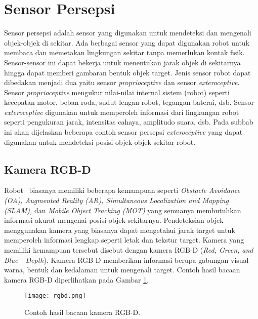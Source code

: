 \section{Sensor Persepsi}
\label{sec:sensor}  
    Sensor persepsi adalah sensor yang digunakan untuk mendeteksi dan mengenali objek-objek di sekitar.
    Ada berbagai sensor yang dapat digunakan robot untuk membaca dan memetakan lingkungan sekitar tanpa memerlukan kontak fisik. Sensor-sensor ini dapat bekerja untuk menentukan jarak objek di sekitarnya hingga dapat memberi gambaran bentuk objek target. Jenis sensor robot dapat dibedakan menjadi dua yaitu sensor \textit{proprioceptive} dan sensor \textit{exteroceptive}\cite{b5}. Sensor \textit{proprioceptive} mengukur nilai-nilai internal sistem (robot) seperti kecepatan motor, beban roda, sudut lengan robot, tegangan baterai, dsb. Sensor \textit{exteroceptive} digunakan untuk memperoleh informasi dari lingkungan robot seperti pengukuran jarak, intensitas cahaya, amplitudo suara, dsb. Pada subbab ini akan dijelaskan beberapa contoh sensor persepsi \textit{exteroceptive} yang dapat digunakan untuk mendeteksi posisi objek-objek sekitar robot.
   
   \subsection{Kamera RGB-D}
    \label{subsec:Sub-Metode_Kamera}
    
    Robot \auto\ biasanya memiliki beberapa kemampuan seperti \textit{Obstacle Avoidance (OA), Augmented Reality (AR), Simultaneous Localization and Mapping (SLAM),} dan \textit{Mobile Object Tracking (MOT)} yang semuanya membutuhkan informasi akurat mengenai posisi objek sekitarnya. Pendeteksian objek menggunakan kamera yang biasanya dapat mengetahui jarak target untuk memperoleh informasi lengkap seperti letak dan tekstur target. Kamera yang memiliki kemampuan tersebut disebut dengan kamera RGB-D (\textit{Red, Green, and Blue - Depth}). Kamera RGB-D memberikan informasi berupa gabungan visual warna, bentuk dan kedalaman untuk mengenali target\cite{b6}. Contoh hasil bacaan kamera RGB-D diperlihatkan pada Gambar \ref{fig:Ch02_rgbd_kamera}.
    \begin{figure}[H]
        \centering
        \texttt{[image: rgbd.png]}
        \caption{Contoh hasil bacaan kamera RGB-D\cite{b6}.}
        \label{fig:Ch02_rgbd_kamera}
    \end{figure}

